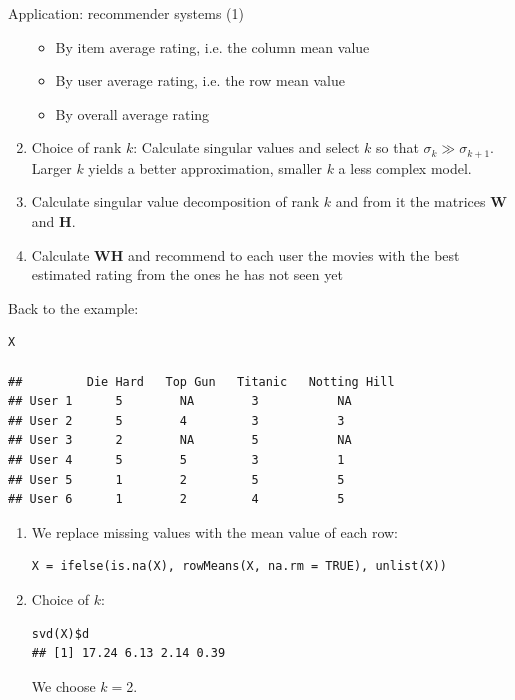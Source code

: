 \documentclass[11pt,compress,t,notes=noshow, xcolor=table]{beamer}
\begin{document}
\begin{vbframe}{Application: recommender systems (1)}
\begin{enumerate}
\begin{itemize}
\item By item average rating, i.e. the column mean value
\item By user average rating, i.e. the row mean value
\item By overall average rating
\end{itemize}
\item Choice of rank $k$: Calculate singular values and select $k$ so that $\sigma_k \gg \sigma_{k + 1}$. Larger $k$ yields a better approximation, smaller $k$ a less complex model.
\item Calculate singular value decomposition of rank $k$ and from it the matrices $\mathbf{W}$ and $\mathbf{H}$.
\item Calculate $\mathbf{W}\mathbf{H}$ and recommend to each user the movies with the best estimated rating from the ones he has not seen yet
\end{enumerate}

\framebreak
Back to the example:
\footnotesize
\begin{verbatim}
X

##         Die Hard   Top Gun   Titanic   Notting Hill
## User 1      5        NA        3           NA
## User 2      5        4         3           3
## User 3      2        NA        5           NA
## User 4      5        5         3           1
## User 5      1        2         5           5
## User 6      1        2         4           5

\end{verbatim}

\normalsize
\begin{enumerate}
\item We replace missing values with the mean value of each row:

\vspace{0.2cm}
\footnotesize
\begin{verbatim}
X = ifelse(is.na(X), rowMeans(X, na.rm = TRUE), unlist(X))
\end{verbatim}


\framebreak
\normalsize
\item Choice of $k$:
\vspace{0.2cm}
\footnotesize
\begin{verbatim}
svd(X)$d
## [1] 17.24 6.13 2.14 0.39
\end{verbatim}

\normalsize
\vspace{0.2cm}
We choose $k = $2.


\end{enumerate}
\end{vbframe}
\end{document}
